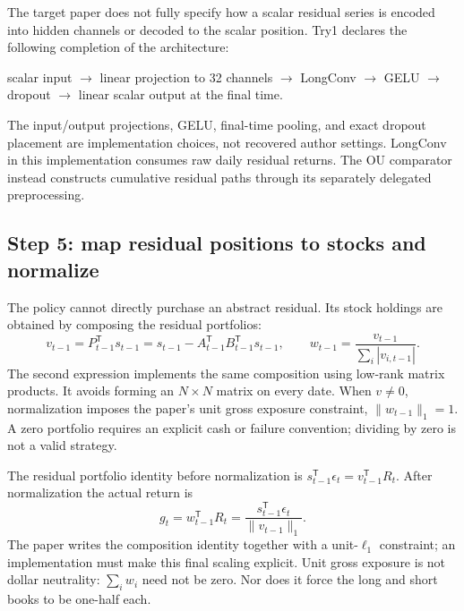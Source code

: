 \documentclass[11pt]{article}
\begin{document}
The target paper does not fully specify how a scalar residual series
is encoded into hidden channels or decoded to the scalar position.
Try1 declares the following completion of the architecture:
\begin{center}
scalar input $\longrightarrow$ linear projection to 32 channels
$\longrightarrow$ LongConv $\longrightarrow$ GELU
$\longrightarrow$ dropout $\longrightarrow$ linear scalar output
at the final time.
\end{center}
The input/output projections, GELU, final-time pooling, and exact
dropout placement are implementation choices, not recovered author
settings. LongConv in this implementation consumes raw daily residual
returns. The OU comparator instead constructs cumulative residual
paths through its separately delegated preprocessing.

\subsection{Step 5: map residual positions to stocks and normalize}
\label{sec:holdings}

The policy cannot directly purchase an abstract residual. Its stock
holdings are obtained by composing the residual portfolios:
\begin{equation}
 v_{t-1}=P_{t-1}^{\mathsf T}s_{t-1}
 =s_{t-1}-A_{t-1}^{\mathsf T}
 B_{t-1}^{\mathsf T}s_{t-1},\qquad
 w_{t-1}=\frac{v_{t-1}}{\sum_i|v_{i,t-1}|}.
 \label{eq:holdings}
\end{equation}
The second expression implements the same composition using low-rank
matrix products. It avoids forming an $N\times N$ matrix on every date.
When $v\ne0$, normalization imposes the paper's unit gross exposure
constraint, $\|w_{t-1}\|_1=1$. A zero portfolio requires an explicit
cash or failure convention; dividing by zero is not a valid strategy.

The residual portfolio identity before normalization is
$s_{t-1}^{\mathsf T}\epsilon_t=v_{t-1}^{\mathsf T}R_t$.
After normalization the actual return is
\begin{equation}
 g_t=w_{t-1}^{\mathsf T}R_t
 =\frac{s_{t-1}^{\mathsf T}\epsilon_t}{\|v_{t-1}\|_1}.
 \label{eq:gross-return}
\end{equation}
The paper writes the composition identity together with a unit-$\ell_1$
constraint; an implementation must make this final scaling explicit.
Unit gross exposure is not dollar neutrality: $\sum_iw_i$ need not be
zero. Nor does it force the long and short books to be one-half each.
\end{document}
